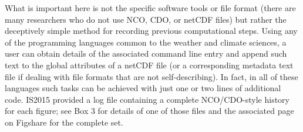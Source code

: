 What is important here is not the specific software tools or file format (there are many researchers who do not use NCO, CDO, or netCDF files) but rather the deceptively simple method for recording previous computational steps. Using any of the programming languages common to the weather and climate sciences, a user can obtain details of the associated command line entry and append such text to the global attributes of a netCDF file (or a corresponding metadata text file if dealing with file formats that are not self-describing). In fact, in all of these languages such tasks can be achieved with just one or two lines of additional code. IS2015 provided a log file containing a complete NCO/CDO-style history for each figure; see Box 3 for details of one of those files and the associated page on Figshare for the complete set.


